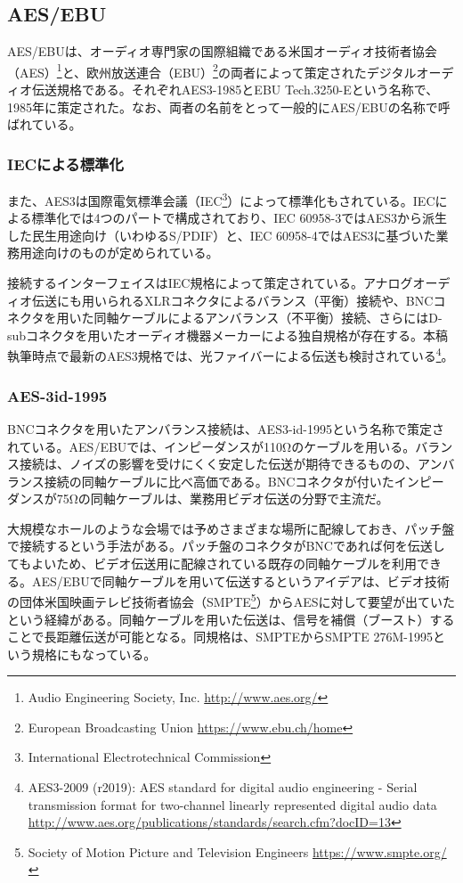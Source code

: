 \subsection{AES/EBU}
\label{sec:aes/ebu}

AES/EBUは、オーディオ専門家の国際組織である米国オーディオ技術者協会（AES）\footnote{Audio Engineering Society, Inc. \url{http://www.aes.org/}}と、欧州放送連合（EBU）\footnote{European Broadcasting Union \url{https://www.ebu.ch/home}}の両者によって策定されたデジタルオーディオ伝送規格である。それぞれAES3-1985\cite{aes3-1985}とEBU Tech.3250-E\cite{ebutech-3250-e}という名称で、1985年に策定された。なお、両者の名前をとって一般的にAES/EBUの名称で呼ばれている。

\subsubsection{IECによる標準化}

また、AES3は国際電気標準会議（IEC\footnote{International Electrotechnical Commission}）によって標準化もされている。IECによる標準化では4つのパートで構成されており、IEC 60958-3ではAES3から派生した民生用途向け（いわゆるS/PDIF）と、IEC 60958-4ではAES3に基づいた業務用途向けのものが定められている。

接続するインターフェイスはIEC規格によって策定されている。アナログオーディオ伝送にも用いられるXLRコネクタによるバランス（平衡）接続や、BNCコネクタを用いた同軸ケーブルによるアンバランス（不平衡）接続、さらにはD-subコネクタを用いたオーディオ機器メーカーによる独自規格が存在する。本稿執筆時点で最新のAES3規格では、光ファイバーによる伝送も検討されている\footnote{AES3-2009 (r2019): AES standard for digital audio engineering - Serial transmission format for two-channel linearly represented digital audio data \url{http://www.aes.org/publications/standards/search.cfm?docID=13}}。

\subsubsection{AES-3id-1995}

BNCコネクタを用いたアンバランス接続は、AES3-id-1995という名称で策定されている。AES/EBUでは、インピーダンスが110Ωのケーブルを用いる。バランス接続は、ノイズの影響を受けにくく安定した伝送が期待できるものの、アンバランス接続の同軸ケーブルに比べ高価である。BNCコネクタが付いたインピーダンスが75Ωの同軸ケーブルは、業務用ビデオ伝送の分野で主流だ。

大規模なホールのような会場では予めさまざまな場所に配線しておき、パッチ盤で接続するという手法がある。パッチ盤のコネクタがBNCであれば何を伝送してもよいため、ビデオ伝送用に配線されている既存の同軸ケーブルを利用できる。AES/EBUで同軸ケーブルを用いて伝送するというアイデアは、ビデオ技術の団体米国映画テレビ技術者協会（SMPTE\footnote{Society of Motion Picture and Television Engineers \url{https://www.smpte.org/}}）からAESに対して要望が出ていたという経緯がある\cite{aes3id-1995-column}。同軸ケーブルを用いた伝送は、信号を補償（ブースト）することで長距離伝送が可能となる。同規格は、SMPTEからSMPTE 276M-1995という規格にもなっている。

